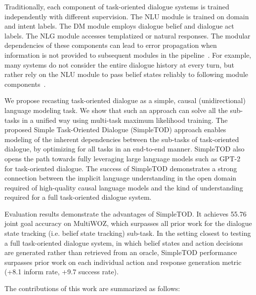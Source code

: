 \documentclass{article}
\begin{document}
Traditionally, each component of task-oriented dialogue systems is trained independently with different supervision. The NLU module is trained on domain and intent labels.
The DM module employs dialogue belief and dialogue act labels. The NLG module accesses templatized or natural responses.
The modular dependencies of these components can lead to error propagation when information is not provided to subsequent modules in the pipeline~\citep{liu2018end}. 
For example, many systems do not consider the entire dialogue history at every turn, 
but rather rely on the NLU module to pass belief states reliably to following module components~\citep{DAMD2019zhang}. 

We propose recasting task-oriented dialogue as a simple, causal (unidirectional) language modeling task.
We show that such an approach can solve all the sub-tasks in a unified way using multi-task maximum likelihood training. 
The proposed Simple Task-Oriented Dialogue (SimpleTOD) approach enables modeling of the inherent dependencies between the sub-tasks of task-oriented dialogue, 
by optimizing for all tasks in an end-to-end manner. 
SimpleTOD also opens the path towards fully leveraging large language models such as GPT-2~\citep{radford2019language} for task-oriented dialogue.
The success of SimpleTOD demonstrates a strong connection between the implicit language understanding in the open domain required of high-quality causal language models and the kind of understanding required for a full task-oriented dialogue system.

Evaluation results demonstrate the advantages of SimpleTOD.
It achieves 55.76 joint goal accuracy on MultiWOZ, 
which surpasses all prior work for the dialogue state tracking (i.e. belief state tracking) sub-task.
In the setting closest to testing a full task-oriented dialogue system, 
in which belief states and action decisions are generated rather than retrieved from an oracle, 
SimpleTOD performance surpasses prior work on each individual action and response generation metric (+8.1 inform rate, +9.7 success rate). 

The contributions of this work are summarized as follows:
\end{document}
